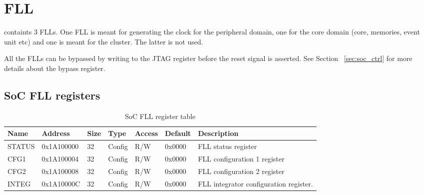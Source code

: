 \section{FLL}

\pulpissimo containts 3 FLLs. One FLL is meant for generating the clock for the
peripheral domain, one for the core domain (core, memories, event unit etc) and
one is meant for the cluster. The latter is not used.

All the FLLs can be bypassed by writing to the JTAG register before the reset
signal is asserted. See Section ~\ref{sec:soc_ctrl} for more details about the
bypass register.

\subsection{SoC FLL registers}
\begin{table}[htbp]
\begin{tabularx}{\textwidth}{|l|l|l|l|l|l|X|}
  \hline
  \textbf{Name} & \textbf{Address}  & \textbf{Size} & \textbf{Type} & \textbf{Access} & \textbf{Default} & \textbf{Description} \\
  \hline
  STATUS & 0x1A100000 & 32 & Config & R/W    & 0x0000 & FLL status register \\
  \hline
  CFG1   & 0x1A100004 & 32 & Config & R/W    & 0x0000 & FLL configuration 1 register \\
  \hline
  CFG2   & 0x1A100008 & 32 & Config & R/W    & 0x0000 & FLL configuration 2 register \\
  \hline
  INTEG  & 0x1A10000C & 32 & Config & R/W    & 0x0000 & FLL integrator configuration register. \\
  \hline
\end{tabularx}
\caption{SoC FLL register table \label{tab:table_label}}
\end{table}



